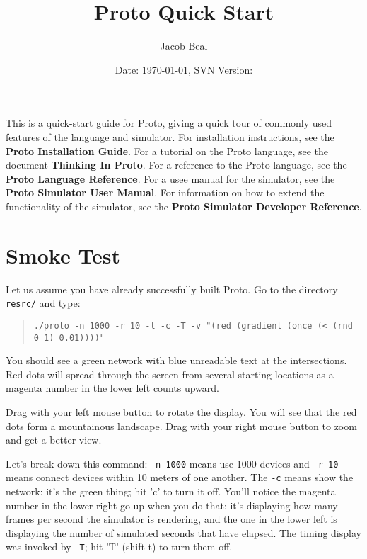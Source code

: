 \documentclass{article}
\title{Proto Quick Start}
\author{Jacob Beal}
\date{Date: \today, SVN Version: \svnrev{}}
\newcommand\code[1]{\begin{quote}\var{#1}\end{quote}}
\newcommand\var[1]{{\tt #1}}
\begin{document}
\maketitle

This is a quick-start guide for Proto, giving a quick tour of commonly
used features of the language and simulator.  For installation
instructions, see the {\bf Proto Installation Guide}.  For a tutorial
on the Proto language, see the document {\bf Thinking In Proto}.  For
a reference to the Proto language, see the {\bf Proto Language
  Reference}.  For a usee manual for the simulator, see the {\bf Proto
  Simulator User Manual}.  For information on how to extend the
functionality of the simulator, see the {\bf Proto Simulator Developer
  Reference}.



\section{Smoke Test}

Let us assume you have already successfully built Proto.
Go to the directory \var{resrc/} and type:
\code{./proto -n 1000 -r 10 -l -c -T -v "(red (gradient (once (< (rnd
  0 1) 0.01))))"}
You should see a green network with blue unreadable text at the
intersections.  Red dots will spread through the screen from
several starting locations as a magenta number in the lower
left counts upward.

Drag with your left mouse button to rotate the display.  You will see
that the red dots form a mountainous landscape.  Drag with your right
mouse button to zoom and get a better view.

Let's break down this command: \var{-n 1000} means use 1000 devices
and \var{-r 10} means connect devices within 10 meters of one another.
The \var{-c} means show the network: it's the green thing; hit 'c' to
turn it off.  You'll notice the magenta number in the lower right go
up when you do that: it's displaying how many frames per second the
simulator is rendering, and the one in the lower left is displaying
the number of simulated seconds that have elapsed.  The timing display
was invoked by \var{-T}; hit 'T' (shift-t) to turn them off.
\end{document}
